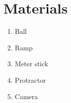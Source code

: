 
\section*{Materials}

\begin{enumerate}[label={\arabic*.}]
  \item{Ball}
  \item{Ramp}
  \item{Meter stick}
  \item{Protractor}
  \item{Camera}
\end{enumerate}
